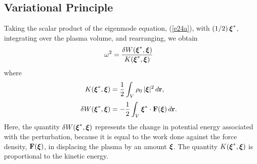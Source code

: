 \documentclass[12pt,prb,aps,notitlepage]{revtex4-1}
\newcommand{\bxi}{\mbox{\boldmath$\xi$}}
\begin{document}
\subsection{Variational Principle}
Taking the scalar product of the eigenmode equation, (\ref{e24a}), with $(1/2)\,\bxi^\ast$, integrating over the
plasma volume, and rearranging,  we obtain
\begin{equation}\label{e101}
\omega^2 = \frac{\delta W(\bxi^\ast,\bxi)}{K(\bxi^\ast,\bxi)}
\end{equation}
where
\begin{align}
K(\bxi^\ast,\bxi) &= \frac{1}{2}\int_V\rho_0\,|\bxi|^2\,d{\bf r},\label{e99}\\[0.5ex]
\delta W(\bxi^\ast,\bxi) &= -\frac{1}{2}\int_V \bxi^\ast\cdot {\bf F}(\bxi)\,d{\bf r}.\label{e100}
\end{align}
Here, the quantity $\delta W(\bxi^\ast,\bxi)$ represents the change in potential energy associated with the perturbation, because it is equal to the work
done against the force density, ${\bf F}(\bxi)$, in displacing the plasma by an amount $\bxi$. The quantity $K(\bxi^\ast,\bxi)$ is
proportional to the kinetic energy. 
\end{document}
